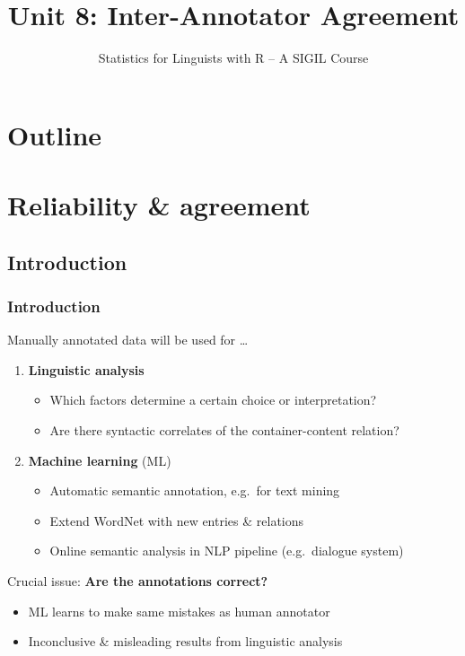 \documentclass[t]{beamer} %
\title[9.\ Inter-annotator agreement]{Unit 8: Inter-Annotator Agreement}
\subtitle{Statistics for Linguists with R -- A SIGIL Course}
\date[sigil.r-forge.r-project.org]{%
  \light{\tiny \sigilcopyright}}
\begin{document}
\frame{\titlepage}


\section*{Outline}

\section{Reliability \& agreement}

\subsection{Introduction}

\begin{frame}
  \frametitle{Introduction}

  Manually annotated data will be used for \ldots\pause
  \begin{enumerate}
  \item \textbf{Linguistic analysis}
    \begin{itemize}
    \item Which factors determine a certain choice or interpretation?
    \item Are there syntactic correlates of the container-content relation?
    \end{itemize}
    \pause
  \item \textbf{Machine learning} (ML)
    \begin{itemize}
    \item Automatic semantic annotation, e.g.\ for text mining
    \item Extend WordNet with new entries \& relations
    \item Online semantic analysis in NLP pipeline (e.g.\ dialogue system)
    \end{itemize}
    \pause
  \end{enumerate}

  \gap[1]
  Crucial issue: \textbf{Are the annotations correct?}
  \begin{itemize}
  \item[\hand] ML learns to make same mistakes as human annotator
  \item[\hand] Inconclusive \& misleading results from linguistic analysis
  \end{itemize}
\end{frame}
\end{document}
